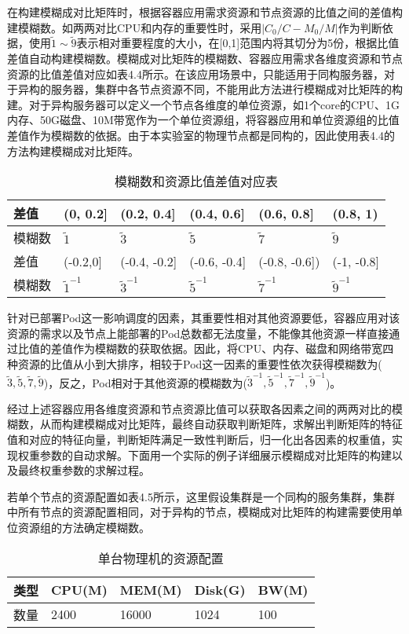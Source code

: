 在构建模糊成对比矩阵时，根据容器应用需求资源和节点资源的比值之间的差值构建模糊数。如两两对比CPU和内存的重要性时，采用$|C_{0}/C-M_{0}/M|$作为判断依据，使用$\widetilde{1}\sim\widetilde{9}$表示相对重要程度的大小，在[0,1]范围内将其切分为5份，根据比值差值自动构建模糊数。模糊成对比矩阵的模糊数、容器应用需求各维度资源和节点资源的比值差值对应如表4.4所示。在该应用场景中，只能适用于同构服务器，对于异构的服务器，集群中各节点资源不同，不能用此方法进行模糊成对比矩阵的构建。对于异构服务器可以定义一个节点各维度的单位资源，如1个core的CPU、1G内存、50G磁盘、10M带宽作为一个单位资源组，将容器应用和单位资源组的比值差值作为模糊数的依据。由于本实验室的物理节点都是同构的，因此使用表4.4的方法构建模糊成对比矩阵。
\begin{table}[htbp]
	\centering\dawu[1.3]
	\caption{模糊数和资源比值差值对应表}
	\begin{tabular}{|p{1.8cm}<{\centering}|p{1.8cm}<{\centering}|p{1.8cm}<{\centering}|p{1.8cm}<{\centering}|p{1.8cm}<{\centering}|p{1.8cm}<{\centering}|} \hline
		差值 & (0, 0.2] & (0.2, 0.4] & (0.4, 0.6] & (0.6, 0.8] & (0.8, 1) \\ \hline
		模糊数 & $\widetilde{1}$ & $\widetilde{3}$ & $\widetilde{5}$ & $\widetilde{7}$  & $\widetilde{9}$  \\ \hline
		差值 & (-0.2,0] & (-0.4, -0.2] & (-0.6, -0.4] & (-0.8, -0.6]) & (-1, -0.8]  \\ \hline
		模糊数 & $\widetilde{1}^{-1}$ & $\widetilde{3}^{-1}$ & $\widetilde{5}^{-1}$ & $\widetilde{7}^{-1}$ & $\widetilde{9}^{-1}$  \\ \hline
	\end{tabular}
\end{table}

针对已部署Pod这一影响调度的因素，其重要性相对其他资源要低，容器应用对该资源的需求以及节点上能部署的Pod总数都无法度量，不能像其他资源一样直接通过比值的差值作为模糊数的获取依据。因此，将CPU、内存、磁盘和网络带宽四种资源的比值从小到大排序，相较于Pod这一因素的重要性依次获得模糊数为(${\widetilde{3},\widetilde{5},\widetilde{7},\widetilde{9}}$)，反之，Pod相对于其他资源的模糊数为(${\widetilde{3}^{-1},\widetilde{5}^{-1},\widetilde{7}^{-1},\widetilde{9}^{-1}}$)。

经过上述容器应用各维度资源和节点资源比值可以获取各因素之间的两两对比的模糊数，从而构建模糊成对比矩阵，最终自动获取判断矩阵，求解出判断矩阵的特征值和对应的特征向量，判断矩阵满足一致性判断后，归一化出各因素的权重值，实现权重参数的自动求解。下面用一个实际的例子详细展示模糊成对比矩阵的构建以及最终权重参数的求解过程。

若单个节点的资源配置如表4.5所示，这里假设集群是一个同构的服务集群，集群中所有节点的资源配置相同，对于异构的节点，模糊成对比矩阵的构建需要使用单位资源组的方法确定模糊数。
\begin{table}[htbp]
	\centering\dawu[1.3]
	\caption{单台物理机的资源配置}
	\begin{tabular}{|p{2cm}<{\centering}|p{2cm}<{\centering}|p{2cm}<{\centering}|p{2cm}<{\centering}|p{2cm}<{\centering}|} \hline
		类型 & CPU(M) & MEM(M) & Disk(G) & BW(M) \\ \hline
		数量 & 2400 & 16000 & 1024 & 100  \\ \hline
	\end{tabular}
\end{table}

